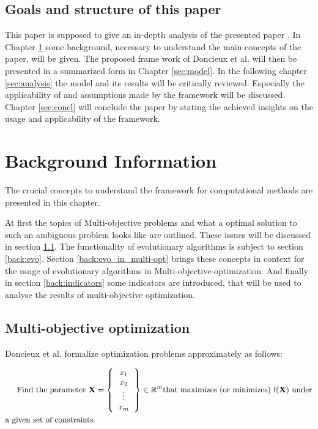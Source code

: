 \documentclass[12pt,twoside]{article}
\theoremstyle{plain}
\theoremstyle{definition}
\theoremstyle{remark}
\begin{document}
\subsection{Goals and structure of this paper}
This paper is supposed to give an in-depth analysis of the presented paper \cite{doncieux2015multi}.
In Chapter \ref{sec:background} some background, necessary to understand the main concepts of the paper, will be given.
The proposed frame work of Doncieux et al. will then be presented in a summarized form in Chapter \ref{sec:model}.
In the following chapter \ref{sec:analysis} the model and its results will be critically reviewed.
Especially the applicability of and assumptions made by the framework will be discussed.
Chapter \ref{sec:concl} will conclude the paper by stating the achieved insights on the usage and applicability of the framework. 
\section{Background Information}
\label{sec:background}
The crucial concepts to understand the framework for computational methods are presented in this chapter.

At first the topics of Multi-objective problems and what a optimal solution to such an ambiguous problem looks like are outlined. These issues will be discussed in section \ref{back:multi-opt}. 
The functionality of evolutionary algorithms is subject to section \ref{back:evo}.
Section \ref{back:evo_in_multi-opt} brings these concepts in context for the usage of evolutionary algorithms in Multi-objective-optimization.
And finally in section \ref{back:indicators} some indicators are introduced, that will be used to analyse the results of multi-objective optimization.

\subsection{Multi-objective optimization}
\label{back:multi-opt}
Doncieux et al. \cite{doncieux2015multi} formalize optimization problems approximately as follows:

\begin{align*}
	\text{Find the parameter }\textbf{X} &=
	\left \{
	\begin{tabular}{c}
		$x_1$\\
		$x_2$\\
		\vdots\\
		$x_m$
	\end{tabular}
	\right \}
	\in \mathbb{R}^m \text{that maximizes (or minimizes) f(\textbf{X}) under}\\
		 \text{a given set of constraints.}
\end{align*}
\end{document}
